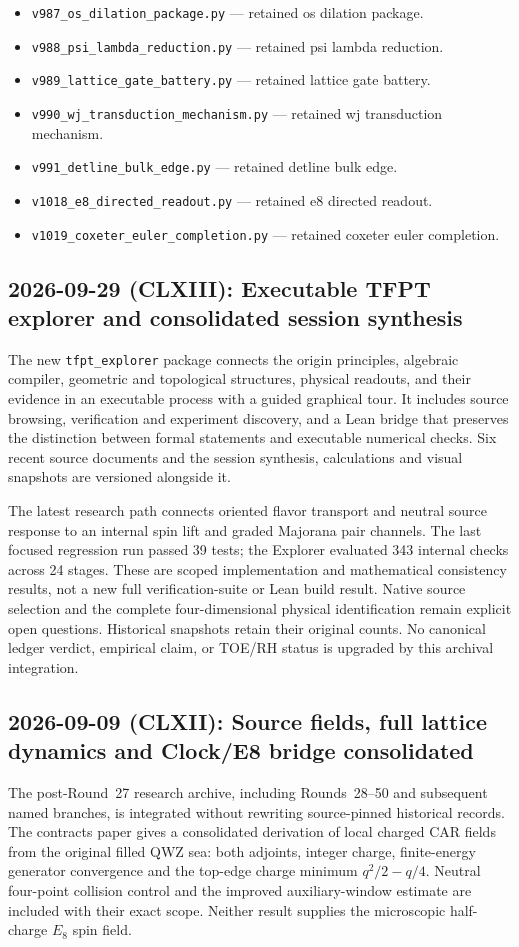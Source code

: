 \documentclass[11pt]{article}
\begin{document}
\begin{itemize}[leftmargin=2em,itemsep=1pt]
\item \texttt{v987\_os\_dilation\_package.py} --- retained os dilation package.
\item \texttt{v988\_psi\_lambda\_reduction.py} --- retained psi lambda reduction.
\item \texttt{v989\_lattice\_gate\_battery.py} --- retained lattice gate battery.
\item \texttt{v990\_wj\_transduction\_mechanism.py} --- retained wj transduction mechanism.
\item \texttt{v991\_detline\_bulk\_edge.py} --- retained detline bulk edge.
\item \texttt{v1018\_e8\_directed\_readout.py} --- retained e8 directed readout.
\item \texttt{v1019\_coxeter\_euler\_completion.py} --- retained coxeter euler completion.
\end{itemize}

\subsection*{2026-09-29 (CLXIII): Executable TFPT explorer and consolidated session synthesis}
The new \texttt{tfpt\_explorer} package connects the origin principles,
algebraic compiler, geometric and topological structures, physical readouts,
and their evidence in an executable process with a guided graphical tour.
It includes source browsing, verification and experiment discovery, and a
Lean bridge that preserves the distinction between formal statements and
executable numerical checks. Six recent source documents and the session
synthesis, calculations and visual snapshots are versioned alongside it.

The latest research path connects oriented flavor transport and neutral
source response to an internal spin lift and graded Majorana pair channels.
The last focused regression run passed 39 tests; the Explorer evaluated
343 internal checks across 24 stages. These are scoped implementation and
mathematical consistency results, not a new full verification-suite or
Lean build result. Native source selection and the complete four-dimensional
physical identification remain explicit open questions. Historical snapshots
retain their original counts. No canonical ledger verdict, empirical claim,
or TOE/RH status is upgraded by this archival integration.

\subsection*{2026-09-09 (CLXII): Source fields, full lattice dynamics and Clock/E8 bridge consolidated}
The post-Round~27 research archive, including Rounds~28--50 and subsequent
named branches, is integrated without rewriting source-pinned historical
records. The contracts paper gives a consolidated derivation of local
charged CAR fields from the original filled QWZ sea: both adjoints,
integer charge, finite-energy generator convergence and the top-edge
charge minimum $q^2/2-q/4$. Neutral four-point collision control and the
improved auxiliary-window estimate are included with their exact scope.
Neither result supplies the microscopic half-charge $E_8$ spin field.
\end{document}
